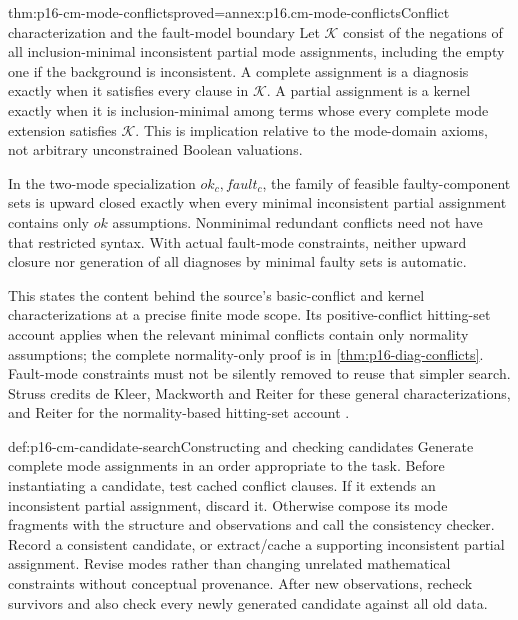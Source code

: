 \begin{hbtheorem}{thm:p16-cm-mode-conflicts}{proved=annex:p16.cm-mode-conflicts}{Conflict characterization and the fault-model boundary}
Let \(\mathcal K\) consist of the negations of all inclusion-minimal
inconsistent partial mode assignments, including the empty one if the
background is inconsistent. A complete assignment is a diagnosis exactly
when it satisfies every clause in \(\mathcal K\). A partial assignment
is a kernel exactly when it is inclusion-minimal among terms whose every
complete mode extension satisfies \(\mathcal K\). This is implication
relative to the mode-domain axioms, not arbitrary unconstrained Boolean
valuations.

In the two-mode specialization \(ok_c,fault_c\), the family of feasible
faulty-component sets is upward closed exactly when every minimal
inconsistent partial assignment contains only \(ok\) assumptions.
Nonminimal redundant conflicts need not have that restricted syntax.
With actual fault-mode constraints, neither upward closure nor generation
of all diagnoses by minimal faulty sets is automatic.
\end{hbtheorem}

This states the content behind the source's basic-conflict and kernel
characterizations at a precise finite mode scope. Its positive-conflict
hitting-set account applies when the relevant minimal conflicts contain
only normality assumptions; the complete normality-only proof is in
\cref{thm:p16-diag-conflicts}. Fault-mode constraints must not be silently
removed to reuse that simpler search. Struss credits de Kleer, Mackworth
and Reiter for these general characterizations, and Reiter for the
normality-based hitting-set account
\cite[Theorems~10.1--10.3 and references~19,62]{Struss2008ModelBasedProblemSolving}.

\begin{hbmethod}{def:p16-cm-candidate-search}{Constructing and checking candidates}
Generate complete mode assignments in an order appropriate to the task.
Before instantiating a candidate, test cached conflict clauses. If it extends
an inconsistent partial assignment, discard it. Otherwise compose its mode
fragments with the structure and observations and call the consistency checker.
Record a consistent candidate, or extract/cache a supporting inconsistent
partial assignment. Revise modes rather than changing unrelated mathematical
constraints without conceptual provenance. After new observations, recheck
survivors and also check every newly generated candidate against all old data.
\end{hbmethod}

